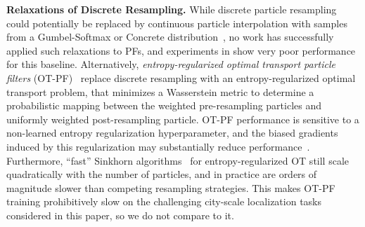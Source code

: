         \textbf{Relaxations of Discrete Resampling.}
        While discrete particle resampling could potentially be replaced by continuous particle interpolation with samples from a Gumbel-Softmax or Concrete distribution~\cite{gumbel_softmax, maddison2016concrete}, no work has successfully applied such relaxations to PFs, and experiments in \citet{younis2023mdpf} show very poor performance for this baseline.
        Alternatively, \emph{entropy-regularized optimal transport particle filters} (OT-PF)~\cite{pmlr-v139-corenflos21a_optimal_transport} replace discrete resampling with an entropy-regularized optimal transport problem, that minimizes a Wasserstein metric to determine a probabilistic mapping between the weighted pre-resampling particles and uniformly weighted post-resampling particle. 
        OT-PF performance is sensitive to a non-learned entropy regularization hyperparameter, and the biased gradients induced by this regularization may substantially reduce performance~\cite{younis2023mdpf}.  Furthermore, ``fast'' Sinkhorn algorithms~\cite{NIPS2013_af21d0c9} for entropy-regularized OT still scale quadratically with the number of particles, and in practice are orders of magnitude slower than competing resampling strategies.  This makes OT-PF training prohibitively slow on the challenging city-scale localization tasks considered in this paper, so we do not compare to it.
        
